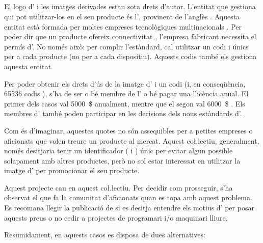 \subsection{}
\label{subsec:usb-if}

El logo d' i les imatges derivades estan sota drets d'autor. L'entitat
que gestiona qui pot utilitzar-los en el seu producte és l',
provinent de l'anglès . Aquesta entitat està
formada per moltes empreses tecnològiques multinacionals \cite{USBGetting}.
Per poder dir que un producte ofereix connectivitat , l'empresa
fabricant necessita el permís d'. No només això: per complir
l'estàndard, cal utilitzar un codi  i  únics per a cada
producte (no per a cada dispositiu). Aquests codis també els gestiona aquesta
entitat.

Per poder obtenir els drets d'ús de la imatge d' i un codi
 (i, en conseqüència, \num[round-mode=places,round-precision=0]{65536}
codis ), s'ha de ser o bé
membre de l' o bé pagar una llicència anual. El
primer dels casos val \SI[round-mode=places,round-precision=0]{5000}{\$}
anualment, mentre que el segon
val \SI[round-mode=places,round-precision=0]{6000}{\$}
\cite{USBGetting}. Els membres d' també poden participar en les
decisions dels nous estàndards d'.

Com és d'imaginar, aquestes quotes no són assequibles per a petites empreses
o aficionats que volen treure un producte al mercat. Aquest co\l.lectiu,
generalment, només desitjaria tenir un identificador ( i )
únic per evitar algun possible solapament amb altres productes, però
no sol estar interessat en utilitzar la imatge d' per promocionar
el seu producte.

Aquest projecte cau en aquest co\l.lectiu. Per decidir com prosseguir, s'ha
observat el que fa la comunitat d'aficionats quan es topa amb aquest problema.
Es recomana llegir la publicació de \cite{Johnson2023usb} si es desitja entendre
els motius d' per posar aquests preus o no cedir 
a projectes de programari i/o maquinari lliure.

Resumidament, en aquests casos es disposa de dues alternatives:

